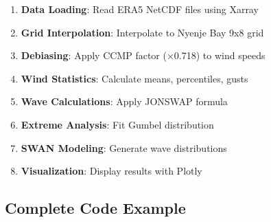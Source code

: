 \documentclass[12pt]{article}
\begin{document}
\begin{enumerate}
    \item \textbf{Data Loading}: Read ERA5 NetCDF files using Xarray
    \item \textbf{Grid Interpolation}: Interpolate to Nyenje Bay 9x8 grid
    \item \textbf{Debiasing}: Apply CCMP factor (×0.718) to wind speeds
    \item \textbf{Wind Statistics}: Calculate means, percentiles, gusts
    \item \textbf{Wave Calculations}: Apply JONSWAP formula
    \item \textbf{Extreme Analysis}: Fit Gumbel distribution
    \item \textbf{SWAN Modeling}: Generate wave distributions
    \item \textbf{Visualization}: Display results with Plotly
\end{enumerate}

\subsection{Complete Code Example}
\end{document}

